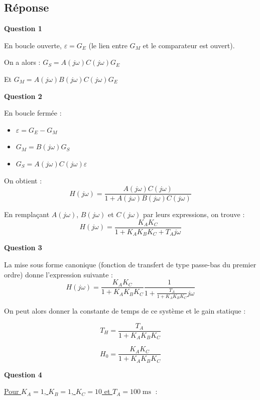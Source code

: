 \documentclass[a4paper,11pt,twoside]{book} %
\begin{document}
\subsection*{Réponse}

\medskip
\textbf{Question 1}

En boucle ouverte, $\varepsilon = G_E$ (le lien entre $G_M$ et le comparateur est ouvert).

On a alors : $\boxed{G_S = A(j \omega) C(j \omega) G_E}$

Et $\boxed{G_M = A(j \omega) B(j \omega) C(j \omega) G_E}$


\noindent\hrulefill

\medskip
\textbf{Question 2}

En boucle fermée : 

\begin{itemize}
	\item $\varepsilon = G_E - G_M$
	\item $G_M = B(j \omega) G_S$
	\item $G_S = A(j \omega) C(j \omega) \varepsilon$
\end{itemize}

On obtient : $$\boxed{H(j \omega) = \frac{A(j \omega) C(j \omega)}{1 + A(j \omega) B(j \omega) C(j \omega)}}$$


En remplaçant $A(j \omega)$, $B(j \omega)$ et $C(j \omega)$ par leurs expressions, on trouve : $$\boxed{H(j \omega) = \frac{K_A K_C}{1 + K_A K_B K_C + T_A j \omega}} $$


\newpage
\medskip
\textbf{Question 3}

La mise sous forme canonique (fonction de transfert de type passe-bas du premier ordre) donne l'expression suivante : $$\boxed{H(j \omega) = \frac{K_A K_C}{1 + K_A K_B K_C} \frac{1}{1 + \frac{T_A}{1 + K_A K_B K_C} j \omega}}$$

\medskip

On peut alors donner la constante de temps de ce système et le gain statique :

$$\boxed{T_H = \frac{T_A}{1 + K_A K_B K_C}}$$

$$\boxed{H_0 = \frac{K_A K_C}{1 + K_A K_B K_C}}$$


\noindent\hrulefill

\medskip
\textbf{Question 4}

\underline{Pour $K_A = 1$, $K_B = 1$, $K_C = 10$ et $T_A = 100\operatorname{ms}$} :
\end{document}
